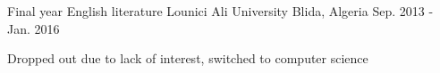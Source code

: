 

\begin{cventries}

  \cventry
    {Final year English literature} %
    {Lounici Ali University} %
    {Blida, Algeria} %
    {Sep. 2013 - Jan. 2016} %
    {
      \begin{cvitems} %
        \item {Dropped out due to lack of interest, switched to computer science}
      \end{cvitems}
    }

\end{cventries}
